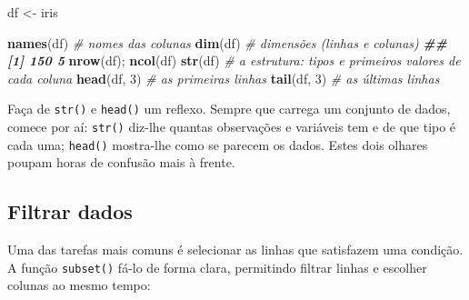 \documentclass[
  portuguese,
  11pt,
  openany]{book}
\newenvironment{Shaded}{\begin{snugshade}}{\end{snugshade}}
\newcommand{\CommentTok}[1]{\textcolor[rgb]{0.56,0.35,0.01}{\textit{#1}}}
\newcommand{\DecValTok}[1]{\textcolor[rgb]{0.00,0.00,0.81}{#1}}
\newcommand{\DocumentationTok}[1]{\textcolor[rgb]{0.56,0.35,0.01}{\textbf{\textit{#1}}}}
\newcommand{\FunctionTok}[1]{\textcolor[rgb]{0.13,0.29,0.53}{\textbf{#1}}}
\newcommand{\NormalTok}[1]{#1}
\newcommand{\OtherTok}[1]{\textcolor[rgb]{0.56,0.35,0.01}{#1}}
\begin{document}
\begin{Shaded}
\begin{Highlighting}[]
\NormalTok{df }\OtherTok{\textless{}{-}}\NormalTok{ iris}

\FunctionTok{names}\NormalTok{(df)     }\CommentTok{\# nomes das colunas}
\FunctionTok{dim}\NormalTok{(df)       }\CommentTok{\# dimensões (linhas e colunas)}
\DocumentationTok{\#\# [1] 150   5}
\FunctionTok{nrow}\NormalTok{(df); }\FunctionTok{ncol}\NormalTok{(df)}
\FunctionTok{str}\NormalTok{(df)       }\CommentTok{\# a estrutura: tipos e primeiros valores de cada coluna}
\FunctionTok{head}\NormalTok{(df, }\DecValTok{3}\NormalTok{)   }\CommentTok{\# as primeiras linhas}
\FunctionTok{tail}\NormalTok{(df, }\DecValTok{3}\NormalTok{)   }\CommentTok{\# as últimas linhas}
\end{Highlighting}
\end{Shaded}

Faça de \texttt{str()} e \texttt{head()} um reflexo. Sempre que carrega um conjunto de dados,
comece por aí: \texttt{str()} diz-lhe quantas observações e variáveis tem e de que tipo
é cada uma; \texttt{head()} mostra-lhe como se parecem os dados. Estes dois olhares
poupam horas de confusão mais à frente.

\subsection{Filtrar dados}\label{filtrar-dados}

Uma das tarefas mais comuns é selecionar as linhas que satisfazem uma condição.
A função \texttt{subset()} fá-lo de forma clara, permitindo filtrar linhas e escolher
colunas ao mesmo tempo:
\end{document}
